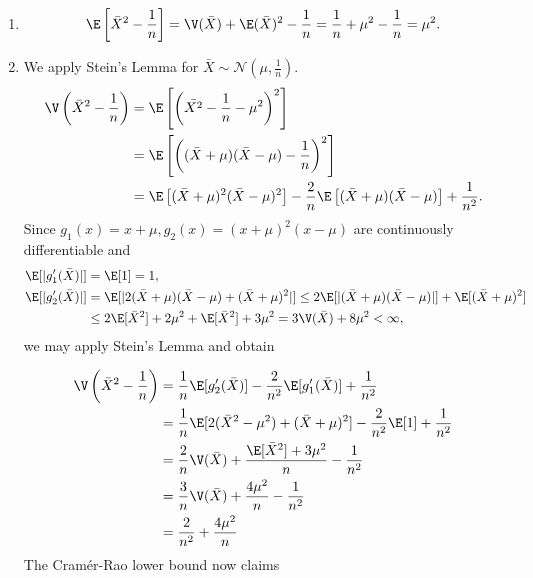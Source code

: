 \begin{solution}
    
\phantom{}

\begin{enumerate}[label = (\alph*)]
  \item 
  \begin{align*}
    \E\left[\bar{X}^2 - \frac{1}{n}\right] 
    = \V(\bar{X}) + \E(\bar{X})^2 - \frac{1}{n}
    = \frac{1}{n} + \mu^2 - \frac{1}{n} = \mu^2.
  \end{align*}
  \item We apply Stein's Lemma for $\bar{X} \sim 
  \mathcal{N}\left(\mu, \frac{1}{n}\right)$.
  \begin{align*}
    \V\left(\bar{X}^2 - \frac{1}{n}\right)
    &= \E\left[\left(\bar{X^2} - \frac{1}{n} - \mu^2\right)^2\right] \\
    &= \E\left[\left((\bar{X} + \mu)(\bar{X} - \mu) - \frac{1}{n}\right)^2\right] \\
    &= \E\left[(\bar{X} + \mu)^2(\bar{X} - \mu)^2\right]
    - \frac{2}{n} \E\left[(\bar{X} + \mu)(\bar{X} - \mu)\right]
    + \frac{1}{n^2}.
  \end{align*}
  Since $g_1(x) = x + \mu, g_2(x) = (x + \mu)^2(x - \mu)$ 
  are continuously differentiable and
  \begin{align*}
    \E[|g_1'(\bar{X})|] &= \E[1] = 1, \\
    \E[|g_2'(\bar{X})|] 
    &= \E[|2(\bar{X} + \mu)(\bar{X} - \mu) + (\bar{X} + \mu)^2|]
    \leq 2\E[|(\bar{X} + \mu)(\bar{X} - \mu)|] + \E[(\bar{X} + \mu)^2] \\
    &\leq 2\E[\bar{X}^2] + 2\mu^2 + \E[\bar{X}^2] + 3\mu^2
    = 3\V(\bar{X}) + 8\mu^2 < \infty,
  \end{align*}
  we may apply Stein's Lemma and obtain

  \begin{align*}
    \V\left(\bar{X}^2 - \frac{1}{n}\right)
    &= \frac{1}{n}\E[g_2'(\bar{X})] - \frac{2}{n^2}\E[g_1'(\bar{X})] + \frac{1}{n^2} \\
    &= \frac{1}{n}\E[2(\bar{X}^2 - \mu^2) + (\bar{X} + \mu)^2] 
    - \frac{2}{n^2}\E[1] + \frac{1}{n^2} \\
    &= \frac{2}{n}\V(\bar{X}) + \frac{\E[\bar{X}^2] + 3\mu^2}{n} - \frac{1}{n^2} \\
    &= \frac{3}{n}\V(\bar{X}) + \frac{4\mu^2}{n} - \frac{1}{n^2} \\
    &= \frac{2}{n^2} + \frac{4\mu^2}{n} \\
  \end{align*}
  The Cramér-Rao lower bound now claims


\end{enumerate}
\end{solution}
